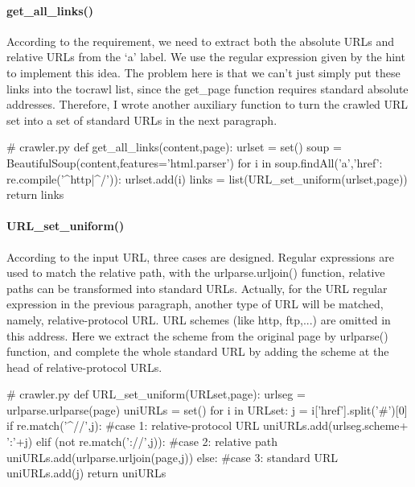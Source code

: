 \documentclass{article}
\begin{document}
\paragraph{get\_all\_links()} According to the requirement, we need to extract both the absolute URLs and relative URLs from the `a' label. We use the regular expression given by the hint to implement this idea. The problem here is that we can't just simply put these links into the tocrawl list, since the get\_page function requires standard absolute addresses. Therefore, I wrote another auxiliary function to turn the crawled URL set into a set of standard URLs in the next paragraph.

\begin{python}
# crawler.py
def get_all_links(content,page):
    urlset = set()
    soup = BeautifulSoup(content,features='html.parser')
    for i in soup.findAll('a',{'href': re.compile('^http|^/')}):
        urlset.add(i)
    links = list(URL_set_uniform(urlset,page))
    return links
\end{python}

\paragraph{URL\_set\_uniform()} According to the input URL, three cases are designed. Regular expressions are used to match the relative path, with the urlparse.urljoin() function, relative paths can be transformed into standard URLs. Actually, for the URL regular expression in the previous paragraph, another type of URL will be matched, namely, relative-protocol URL. URL schemes (like http, ftp,...) are omitted in this address. Here we extract the scheme from the original page by urlparse() function, and complete the whole standard URL by adding the scheme at the head of relative-protocol URLs.  

\begin{python}
# crawler.py
def URL_set_uniform(URLset,page):
    urlseg = urlparse.urlparse(page)
    uniURLs = set()
    for i in URLset:
        j = i['href'].split('#')[0]
        if re.match('^//',j):         #case 1: relative-protocol URL
            uniURLs.add(urlseg.scheme+ ':'+j)
        elif (not re.match('://',j)): #case 2: relative path
            uniURLs.add(urlparse.urljoin(page,j))
        else:                         #case 3: standard URL
            uniURLs.add(j)
    return uniURLs
\end{python}
\end{document}
